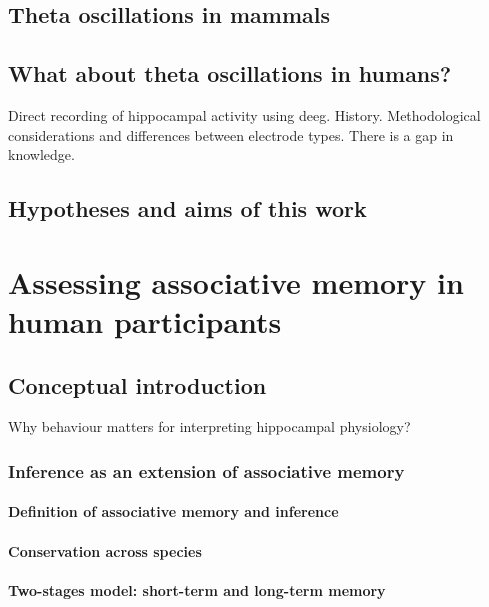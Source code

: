 \documentclass[12pt,a4paper]{report}
\newcommand{\g}[1]{\gls{#1}}     %
\begin{document}
\section{Theta oscillations in mammals}

\section{What about theta oscillations in humans?}
Direct recording of hippocampal activity using \g{deeg}. History. Methodological considerations and differences between electrode types. There is a gap in knowledge.

\section{Hypotheses and aims of this work}

\chapter{Assessing associative memory in human participants} %
\label{chap:behaviour}

\section{Conceptual introduction} %
Why behaviour matters for interpreting hippocampal physiology?

\subsection{Inference as an extension of associative memory}
\subsubsection{Definition of associative memory and inference}
\subsubsection{Conservation across species}
\subsubsection{Two-stages model: short-term and long-term memory}
\end{document}

